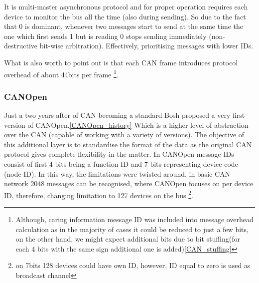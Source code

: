 It is multi-master asynchronous protocol and for proper operation requires each device to monitor the bus all the time (also during sending). So due to the fact that 0 is dominant, whenever two messages start to send at the same time the one which first sends 1 but is reading 0 stops sending immediately (non-destructive bit-wise arbitration). Effectively, prioritising messages with lower IDs.

What is also worth to point out is that each CAN frame introduces protocol overhead of about 44bits per frame \footnote{Although, caring information message ID was included into message overhead calculation as in the majority of cases it could be reduced to just a few bits, on the other hand, we might expect additional bits due to bit stuffing(for each 4 bits with the same sign additional one is added)\ref{CAN_stuffing}}.

\subsubsection{CANOpen}
Just a two years after of CAN becoming a standard Bosh proposed a very first version of CANOpen.\ref{CANOpen_history}
Which is a higher level of abstraction over the CAN (capable of working with a variety of versions). The objective of this additional layer is to standardise the format of the data as the original CAN protocol gives complete flexibility in the matter. 
In CANOpen message IDs consist of first 4 bits being a function ID and 7 bits representing device code (node ID). In this way, the limitations were twisted around, in basic CAN network 2048 messages can be recognised, where CANOpen focuses on per device ID, therefore, changing limitation to 127 devices on the bus \footnote{on 7bits 128 devices could have own ID, however, ID equal to zero is used as broadcast channel}.

